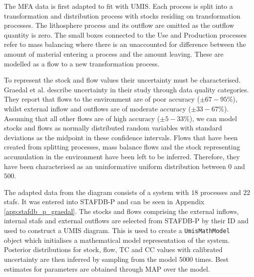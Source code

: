\documentclass[ %
                    author={Tom Jager},
                supervisor={Dr. Daniel Schien},
                    degree={MEng},
                     title={A Bayesian Inference Engine for Calibrating Uncertainty over UMIS Structured MFA Systems},
                  subtitle={},
                      type={research},
                      year={2019} ]{dissertation}
\begin{document}
The MFA data is first adapted to fit with UMIS. Each process is split into a transformation and distribution process with stocks residing on transformation processes. The lithosphere process and its outflow are omitted as the outflow quantity is zero. The small boxes connected to the Use and Production processes refer to mass balancing where there is an unaccounted for difference between the amount of material entering a process and the amount leaving. These are modelled as a flow to a new transformation process.

To represent the stock and flow values their uncertainty must be characterised. Graedal et al. describe uncertainty in their study through data quality categories. They report that flows to the environment are of poor accuracy ($\pm 67 - 95\%$), whilst external inflow and outflows are of moderate accuracy ($\pm 33 - 67\%$). Assuming that all other flows are of high accuracy ($\pm 5 - 33\%$), we can model stocks and flows as normally distributed random variables with standard deviations as the midpoint in these confidence intervals. Flows that have been created from splitting processes, mass balance flows and the stock representing accumulation in the environment have been left to be inferred. Therefore, they have been characterised as an uninformative uniform distribution between $0$ and $500$. 

The adapted data from the diagram consists of a system with $18$ processes and $22$ stafs. It was entered into STAFDB-P and can be seen in Appendix \ref{app:stafdb_p_graedal}. The stocks and flows comprising the external inflows, internal stafs and external outflows are selected from STAFDB-P by their ID and used to construct a UMIS diagram. This is used to create a \texttt{UmisMathModel} object which initialises a mathematical model representation of the system. Posterior distributions for stock, flow, TC and CC values with calibrated uncertainty are then inferred by sampling from the model $5000$ times. Best estimates for parameters are obtained through MAP over the model.
\end{document}

